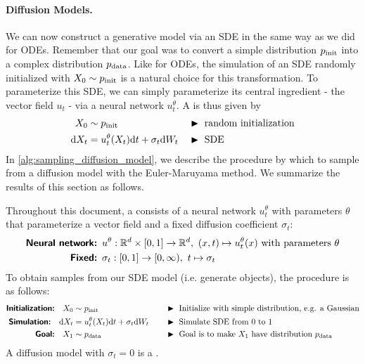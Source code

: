 \paragraph{Diffusion Models.} We can now construct a generative model via an SDE in the same way as we did for ODEs. Remember that our goal was to convert a simple distribution $p_{\rm{init}}$ into a complex distribution $p_{\rm{data}}$. Like for ODEs, the simulation of an SDE randomly initialized with $X_0\sim p_{\rm{init}}$ is a natural choice for this transformation. To parameterize this SDE, we can simply parameterize its central ingredient - the vector field $u_t$ - via a neural network $u_t^\theta$. A  is thus given by
\begin{align*}
    X_0 &\sim p_{\rm{init}}  &&\blacktriangleright\,\,\text{random initialization}\\
    \mathrm{d} X_t &= u_t^\theta(X_t)\mathrm{d} t + \sigma_t \mathrm{d} W_t &&\blacktriangleright\,\,\text{SDE}
    \end{align*}
In \cref{alg:sampling_diffusion_model}, we describe the procedure by which to sample from a diffusion model with the Euler-Maruyama method. We summarize the results of this section as follows.
\begin{summarybox} Throughout this document, a  consists of a neural network $u_t^\theta$ with parameters $\theta$ that parameterize a vector field and a fixed  diffusion coefficient $\sigma_t$:
\begin{align*}
    \textbf{\sffamily Neural network: }&u^\theta:\R^d\times [0,1]\to \R^d,\,\, (x,t)\mapsto u_t^\theta(x)\text{  with parameters }\theta\\
    \textbf{\sffamily Fixed: }&\sigma_t:[0,1]\to [0,\infty),\,\, t\mapsto \sigma_t
\end{align*}
To obtain samples from our SDE model (i.e. generate objects), the procedure is as follows:
\begin{align*}
\textbf{\sffamily Initialization:}\quad X_0&\sim\pinit \quad  &&\blacktriangleright\,\,\text{Initialize with simple distribution, e.g. a Gaussian}\\
    \textbf{\sffamily Simulation:}\quad \dd X_t &= u_t^\theta(X_t)\dd t + \sigma_t\dd W_t\quad &&\blacktriangleright\,\,\text{Simulate SDE from 0 to 1}\\
    \textbf{\sffamily Goal:}\quad X_1 &\sim  \pdata \quad &&\blacktriangleright\,\,\text{Goal is to make $X_1$ have distribution $\pdata$}
\end{align*}
A diffusion model with $\sigma_t=0$ is a .
\label{summary:diffusion_model}
\end{summarybox}